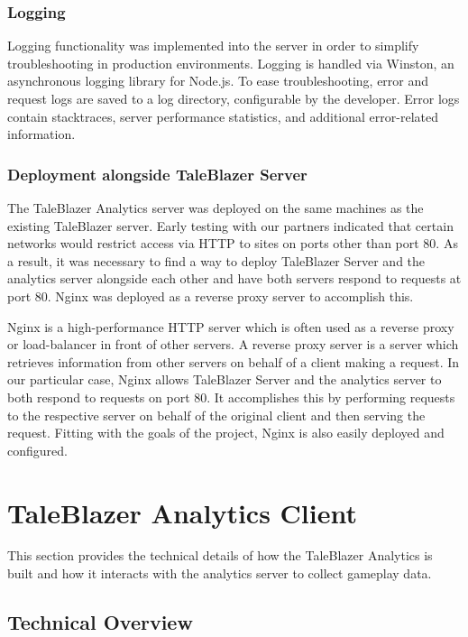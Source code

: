 \subsubsection{Logging}

Logging functionality was implemented into the server in order to simplify troubleshooting in production environments. Logging is handled via Winston, an asynchronous logging library for Node.js. To ease troubleshooting, error and request logs are saved to a log directory, configurable by the developer. Error logs contain stacktraces, server performance statistics, and additional error-related information.

\subsubsection{Deployment alongside TaleBlazer Server}

The TaleBlazer Analytics server was deployed on the same machines as the existing TaleBlazer server. Early testing with our partners indicated that certain networks would restrict access via HTTP to sites on ports other than port 80. As a result, it was necessary to find a way to deploy TaleBlazer Server and the analytics server alongside each other and have both servers respond to requests at port 80. Nginx was deployed as a reverse proxy server to accomplish this. 

Nginx is a high-performance HTTP server which is often used as a reverse proxy or load-balancer in front of other servers. A reverse proxy server is a server which retrieves information from other servers on behalf of a client making a request. In our particular case, Nginx allows TaleBlazer Server and the analytics server to both respond to requests on port 80. It accomplishes this by performing requests to the respective server on behalf of the original client and then serving the request. Fitting with the goals of the project, Nginx is also easily deployed and configured.

\section{TaleBlazer Analytics Client}

This section provides the technical details of how the TaleBlazer Analytics is built and how it interacts with the analytics server to collect gameplay data. 

\subsection{Technical Overview}


